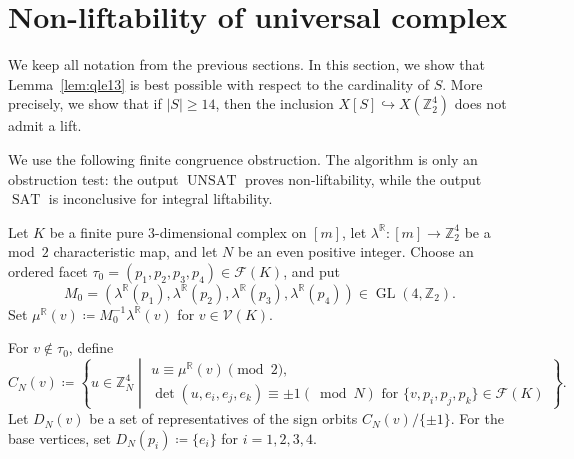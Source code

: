 \documentclass{amsart}
\newcommand{\Z}{\mathbb{Z}}
\newcommand{\R}{\mathbb{R}}
\newcommand{\cF}{\mathcal{F}}
\newcommand{\cV}{\mathcal{V}}
\DeclareMathOperator{\GL}{GL}
\DeclareMathOperator{\SAT}{SAT}
\DeclareMathOperator{\UNSAT}{UNSAT}
\theoremstyle{definition}
\theoremstyle{remark}
\begin{document}
\section{Non-liftability of universal complex} \label{non-liftability}

We keep all notation from the previous sections. 
In this section, we show that Lemma~\ref{lem:qle13} is best possible with respect to the cardinality of $S$. 
More precisely, we show that if $|S|\geq 14$, then the inclusion $X[S]\hookrightarrow X(\Z_2^4)$ does not admit a lift.

We use the following finite congruence obstruction. 
The algorithm is only an obstruction test: the output $\UNSAT$ proves non-liftability, while the output $\SAT$ is inconclusive for integral liftability.

Let $K$ be a finite pure $3$-dimensional complex on $[m]$, let $\lambda^\R \colon [m]\to \Z_2^4$ be a mod~$2$ characteristic map, and let $N$ be an even positive integer.
Choose an ordered facet $\tau_0=(p_1,p_2,p_3,p_4)\in \cF(K)$, and put
$$
    M_0=(\lambda^\R(p_1),\lambda^\R(p_2),\lambda^\R(p_3),\lambda^\R(p_4)) \in \GL(4,\Z_2).
$$
Set $\mu^\R(v)\coloneq M_0^{-1}\lambda^\R(v)$ for $v\in \cV(K)$.

For $v\notin\tau_0$, define
$$
    C_N(v)\coloneq \left\{ u\in \Z_N^4  \middle| 
        \begin{array}{l}
            u\equiv \mu^\R(v)\pmod2,\\
            \det(u,e_i,e_j,e_k)\equiv \pm1 (\bmod N) \text{ for }\{v,p_i,p_j,p_k\}\in \cF(K)
        \end{array}
    \right\}.
$$
Let $D_N(v)$ be a set of representatives of the sign orbits $C_N(v)/\{\pm1\}$.
For the base vertices, set $D_N(p_i)\coloneq\{e_i\}$ for $i=1,2,3,4$.
\end{document}

